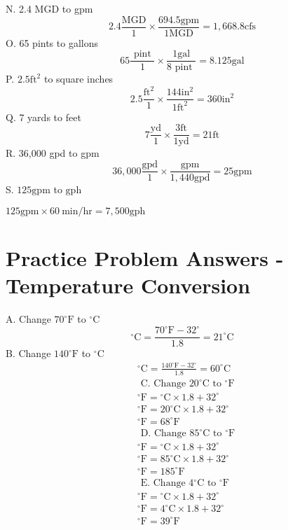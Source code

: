 N. 2.4 MGD to gpm
$$
2.4 \frac{\mathrm{MGD}}{1} \times \frac{694.5 \mathrm{gpm}}{1 \mathrm{MGD}}=1,668.8 \mathrm{cfs}
$$
O. 65 pints to gallons
$$
65 \frac{\text { pint }}{1} \times \frac{1 \mathrm{gal}}{8 \text { pint }}=8.125 \mathrm{gal}
$$
P. $2.5 \mathrm{ft}^{2}$ to square inches
$$
2.5 \frac{\mathrm{ft}^{2}}{1} \times \frac{144 \mathrm{in}^{2}}{1 \mathrm{ft}^{2}}=360 \mathrm{in}^{2}
$$
Q. 7 yards to feet
$$
7 \frac{\mathrm{yd}}{1} \times \frac{3 \mathrm{ft}}{1 \mathrm{yd}}=21 \mathrm{ft}
$$
R. 36,000 gpd to gpm
$$
36,000 \frac{\mathrm{gpd}}{1} \times \frac{\mathrm{gpm}}{1,440 \mathrm{gpd}}=25 \mathrm{gpm}
$$
S. $125 \mathrm{gpm}$ to $\mathrm{gph}$

$125 \mathrm{gpm} \times 60 \mathrm{~min} / \mathrm{hr}=7,500 \mathrm{gph}$

\section{Practice Problem Answers - Temperature Conversion}
A. Change $70^{\circ} \mathrm{F}$ to ${ }^{\circ} \mathrm{C}$
$$
{ }^{\circ} \mathrm{C}=\frac{70^{\circ} \mathrm{F}-32^{\circ}}{1.8}=21^{\circ} \mathrm{C}
$$
B. Change $140^{\circ} \mathrm{F}$ to ${ }^{\circ} \mathrm{C}$
$$
\begin{aligned}
&{ }^{\circ} \mathrm{C}=\frac{140^{\circ} \mathrm{F}-32^{\circ}}{1.8}=60^{\circ} \mathrm{C} \\
&\text { C. Change } 20^{\circ} \mathrm{C} \text { to }{ }^{\circ} \mathrm{F} \\
&{ }^{\circ} \mathrm{F}={ }^{\circ} \mathrm{C} \times 1.8+32^{\circ} \\
&{ }^{\circ} \mathrm{F}=20^{\circ} \mathrm{C} \times 1.8+32^{\circ} \\
&{ }^{\circ} \mathrm{F}=68^{\circ} \mathrm{F} \\
&\text { D. Change } 85^{\circ} \mathrm{C} \text { to }{ }^{\circ} \mathrm{F} \\
&{ }^{\circ} \mathrm{F}={ }^{\circ} \mathrm{C} \times 1.8+32^{\circ} \\
&{ }^{\circ} \mathrm{F}=85^{\circ} \mathrm{C} \times 1.8+32^{\circ} \\
&{ }^{\circ} \mathrm{F}=185^{\circ} \mathrm{F} \\
&\text { E. Change } 4{ }^{\circ} \mathrm{C} \text { to }{ }^{\circ} \mathrm{F} \\
&{ }^{\circ} \mathrm{F}={ }^{\circ} \mathrm{C} \times 1.8+32^{\circ} \\
&{ }^{\circ} \mathrm{F}=4^{\circ} \mathrm{C} \times 1.8+32^{\circ} \\
&{ }^{\circ} \mathrm{F}=39^{\circ} \mathrm{F}
\end{aligned}
$$

